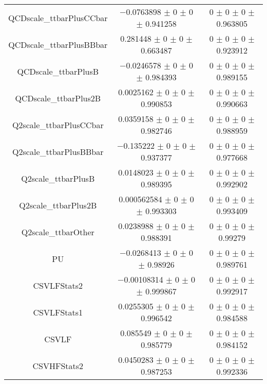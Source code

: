 \begin{table}
\begin{tabular}{ccc}
QCDscale\_ttbarPlusCCbar & \num{-0.0763898} $\pm$ \num{0} $\pm$ \num{0} $\pm$ \num{0.941258} & \num{0} $\pm$ \num{0} $\pm$ \num{0} $\pm$ \num{0.963805}\\
QCDscale\_ttbarPlusBBbar & \num{0.281448} $\pm$ \num{0} $\pm$ \num{0} $\pm$ \num{0.663487} & \num{0} $\pm$ \num{0} $\pm$ \num{0} $\pm$ \num{0.923912}\\
QCDscale\_ttbarPlusB & \num{-0.0246578} $\pm$ \num{0} $\pm$ \num{0} $\pm$ \num{0.984393} & \num{0} $\pm$ \num{0} $\pm$ \num{0} $\pm$ \num{0.989155}\\
QCDscale\_ttbarPlus2B & \num{0.0025162} $\pm$ \num{0} $\pm$ \num{0} $\pm$ \num{0.990853} & \num{0} $\pm$ \num{0} $\pm$ \num{0} $\pm$ \num{0.990663}\\
Q2scale\_ttbarPlusCCbar & \num{0.0359158} $\pm$ \num{0} $\pm$ \num{0} $\pm$ \num{0.982746} & \num{0} $\pm$ \num{0} $\pm$ \num{0} $\pm$ \num{0.988959}\\
Q2scale\_ttbarPlusBBbar & \num{-0.135222} $\pm$ \num{0} $\pm$ \num{0} $\pm$ \num{0.937377} & \num{0} $\pm$ \num{0} $\pm$ \num{0} $\pm$ \num{0.977668}\\
Q2scale\_ttbarPlusB & \num{0.0148023} $\pm$ \num{0} $\pm$ \num{0} $\pm$ \num{0.989395} & \num{0} $\pm$ \num{0} $\pm$ \num{0} $\pm$ \num{0.992902}\\
Q2scale\_ttbarPlus2B & \num{0.000562584} $\pm$ \num{0} $\pm$ \num{0} $\pm$ \num{0.993303} & \num{0} $\pm$ \num{0} $\pm$ \num{0} $\pm$ \num{0.993409}\\
Q2scale\_ttbarOther & \num{0.0238988} $\pm$ \num{0} $\pm$ \num{0} $\pm$ \num{0.988391} & \num{0} $\pm$ \num{0} $\pm$ \num{0} $\pm$ \num{0.99279}\\
PU & \num{-0.0268413} $\pm$ \num{0} $\pm$ \num{0} $\pm$ \num{0.98926} & \num{0} $\pm$ \num{0} $\pm$ \num{0} $\pm$ \num{0.989761}\\
CSVLFStats2 & \num{-0.00108314} $\pm$ \num{0} $\pm$ \num{0} $\pm$ \num{0.999867} & \num{0} $\pm$ \num{0} $\pm$ \num{0} $\pm$ \num{0.992917}\\
CSVLFStats1 & \num{0.0255305} $\pm$ \num{0} $\pm$ \num{0} $\pm$ \num{0.996542} & \num{0} $\pm$ \num{0} $\pm$ \num{0} $\pm$ \num{0.984588}\\
CSVLF & \num{0.085549} $\pm$ \num{0} $\pm$ \num{0} $\pm$ \num{0.985779} & \num{0} $\pm$ \num{0} $\pm$ \num{0} $\pm$ \num{0.984152}\\
CSVHFStats2 & \num{0.0450283} $\pm$ \num{0} $\pm$ \num{0} $\pm$ \num{0.987253} & \num{0} $\pm$ \num{0} $\pm$ \num{0} $\pm$ \num{0.992336}\\

\end{tabular}
\end{table}
